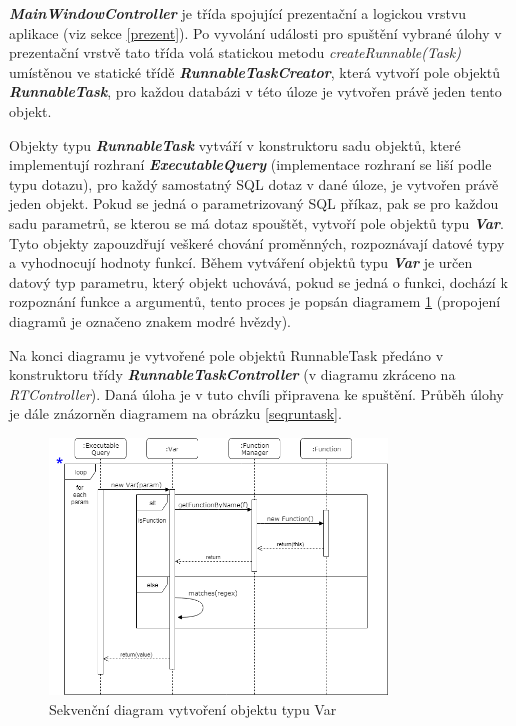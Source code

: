 \documentclass[czech,bachelor,public,dept460,male,cpdeclaration,twoside]{diploma}
\begin{document}
\textbf{\emph{MainWindowController}} je třída spojující prezentační a logickou vrstvu aplikace (viz sekce \ref{prezent}). Po vyvolání události pro spuštění vybrané úlohy v prezentační vrstvě tato třída volá statickou metodu \textit{createRunnable(Task)} umístěnou ve statické třídě \textbf{\emph{RunnableTaskCreator}}, která vytvoří pole objektů \textbf{\emph{RunnableTask}}, pro každou databázi v této úloze je vytvořen právě jeden tento objekt.

Objekty typu \textbf{\emph{RunnableTask}} vytváří v konstruktoru sadu objektů, které implementují rozhraní \textbf{\emph{ExecutableQuery}} (implementace rozhraní se liší podle typu dotazu), pro každý samostatný SQL dotaz v dané úloze, je vytvořen právě jeden objekt. Pokud se jedná o parametrizovaný SQL příkaz, pak se pro každou sadu parametrů, se kterou se má dotaz spouštět, vytvoří pole objektů typu \textbf{\emph{Var}}. Tyto objekty zapouzdřují veškeré chování proměnných, rozpoznávají datové typy a vyhodnocují hodnoty funkcí. Během vytváření objektů typu \textbf{\emph{Var}} je určen datový typ parametru, který objekt uchovává, pokud se jedná o funkci, dochází k rozpoznání funkce a argumentů, tento proces je popsán diagramem \ref{seqvar} (propojení diagramů je označeno znakem modré hvězdy).


Na konci diagramu je vytvořené pole objektů RunnableTask předáno v konstruktoru třídy  \textbf{\emph{RunnableTaskController}} (v diagramu zkráceno na \textit{RTController}). Daná úloha je v tuto chvíli připravena ke spuštění. Průběh úlohy je dále znázorněn diagramem na obrázku \ref{seqruntask}.


\begin{figure}[!htbp]\centering\includegraphics[width=0.8\textwidth]{Figures/var.png}\caption{Sekvenční diagram vytvoření objektu typu Var}
\label{seqvar}
\end{figure}
\end{document}
